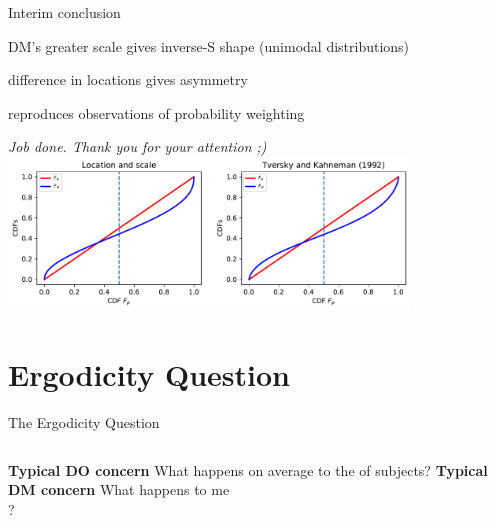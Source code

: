 % 

\begin{frame}{Interim conclusion}
\bi
	\item DM's greater scale gives inverse-S shape (unimodal distributions)
	\item difference in locations gives asymmetry
	\item reproduces observations of probability weighting
	\item[]
	\item[] \textit{Job done. Thank you for your attention ;)}
	\hfill
	\hyperlink{FunctionalForms}{}
	\label{InterimConclusion}
\ei
	\vspace{2em}
	\centering
	\includegraphics[width=0.8\textwidth]{../../figs/Our_result_LocScale_vs_KT.pdf}
\end{frame}

\section{Ergodicity Question}

\begin{frame}{The Ergodicity Question}
\begin{columns}[T]
	\bc \textbf{Typical DO concern} \ec
	What happens on average to the  of subjects?
\centering \vspace{4em}  \red{\large $\neq$}
	\bc \textbf{Typical DM concern} \ec
	What happens to me \\
	?
\end{columns}
\end{frame}


